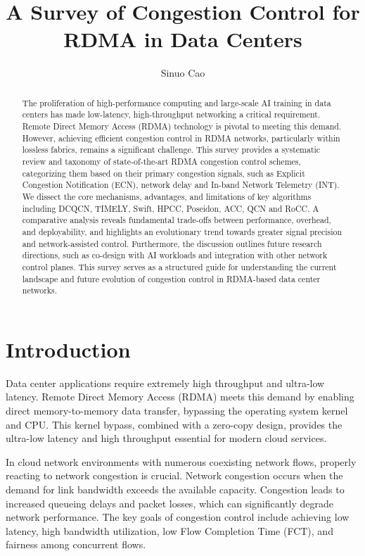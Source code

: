 \documentclass[11pt,en]{elegantpaper}
\title{A Survey of Congestion Control for RDMA in Data Centers}
\author{Sinuo Cao}
\institute{School of Computer Science, Peking University}
\begin{document}
\maketitle

\begin{abstract}
The proliferation of high-performance computing and large-scale AI training in data centers has made low-latency, high-throughput networking a critical requirement. Remote Direct Memory Access (RDMA) technology is pivotal to meeting this demand. However, achieving efficient congestion control in RDMA networks, particularly within lossless fabrics, remains a significant challenge. This survey provides a systematic review and taxonomy of state-of-the-art RDMA congestion control schemes, categorizing them based on their primary congestion signals, such as Explicit Congestion Notification (ECN), network delay and In-band Network Telemetry (INT). We dissect the core mechanisms, advantages, and limitations of key algorithms including DCQCN, TIMELY, Swift, HPCC, Poseidon, ACC, QCN and RoCC. A comparative analysis reveals fundamental trade-offs between performance, overhead, and deployability, and highlights an evolutionary trend towards greater signal precision and network-assisted control. Furthermore, the discussion outlines future research directions, such as co-design with AI workloads and integration with other network control planes. This survey serves as a structured guide for understanding the current landscape and future evolution of congestion control in RDMA-based data center networks.

\end{abstract}


\section{Introduction}
\label{sec:intro}

Data center applications require extremely high throughput and ultra-low latency. Remote Direct Memory Access (RDMA) meets this demand by enabling direct memory-to-memory data transfer, bypassing the operating system kernel and CPU. This kernel bypass, combined with a zero-copy design, provides the ultra-low latency and high throughput essential for modern cloud services.

In cloud network environments with numerous coexisting network flows, properly reacting to network congestion is crucial. Network congestion occurs when the demand for link bandwidth exceeds the available capacity. Congestion leads to increased queueing delays and packet losses, which can significantly degrade network performance. The key goals of congestion control include achieving low latency, high bandwidth utilization, low Flow Completion Time (FCT), and fairness among concurrent flows.
\end{document}
